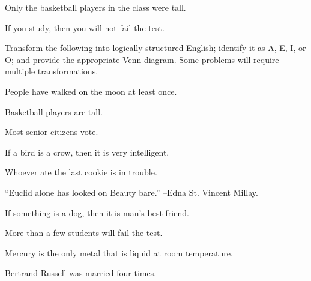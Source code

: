 \begin{exercises}
\item Only the basketball players in the class were tall. 

\item If you study, then you will not fail the test.

\end{exercises}


\noindent\problempart Transform the following into logically structured English; identify it as A, E, I, or O; and provide the appropriate Venn diagram. Some problems will require multiple transformations.

\begin{exercises}
\item People have walked on the moon at least once. 
\item Basketball players are tall.
\item Most senior citizens vote.
\item If a bird is a crow, then it is very intelligent. 
\item Whoever ate the last cookie is in trouble.
\item ``Euclid alone has looked on Beauty bare.'' --Edna St. Vincent Millay.
\item If something is a dog, then it is man's best friend.
\item More than a few students will fail the test.
\item Mercury is the only metal that is liquid at room temperature. 
\item Bertrand Russell was married four times.
\end{exercises}

